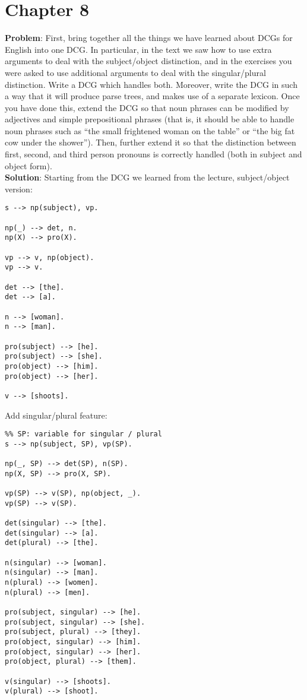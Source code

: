 \documentclass{article}
\begin{document}
\section{Chapter 8}
\textbf{Problem}: First, bring together all the things we have learned
about DCGs for English into one DCG.
In particular, in the text we saw how to use extra arguments
to deal with the subject/object distinction,
and in the exercises you were asked to use additional arguments
to deal with the singular/plural distinction.
Write a DCG which handles both.
Moreover, write the DCG in such a way that
it will produce parse trees, and makes use of a separate lexicon.
Once you have done this, extend the DCG so that
noun phrases can be modified by adjectives
and simple prepositional phrases
(that is, it should be able to handle noun phrases such as
“the small frightened woman on the table” or “the big fat cow under the shower”).
Then, further extend it so that the distinction between
first, second, and third person pronouns is correctly handled
(both in subject and object form). \\

\noindent
\textbf{Solution}:
Starting from the DCG we learned from the lecture, subject/object version:
\begin{verbatim}
s --> np(subject), vp.

np(_) --> det, n.
np(X) --> pro(X).

vp --> v, np(object).
vp --> v.

det --> [the].
det --> [a].

n --> [woman].
n --> [man].

pro(subject) --> [he].
pro(subject) --> [she].
pro(object) --> [him].
pro(object) --> [her].

v --> [shoots].
\end{verbatim}

\noindent
Add singular/plural feature:
\begin{verbatim}
%% SP: variable for singular / plural
s --> np(subject, SP), vp(SP).

np(_, SP) --> det(SP), n(SP).
np(X, SP) --> pro(X, SP).

vp(SP) --> v(SP), np(object, _).
vp(SP) --> v(SP).

det(singular) --> [the].
det(singular) --> [a].
det(plural) --> [the].

n(singular) --> [woman].
n(singular) --> [man].
n(plural) --> [women].
n(plural) --> [men].

pro(subject, singular) --> [he].
pro(subject, singular) --> [she].
pro(subject, plural) --> [they].
pro(object, singular) --> [him].
pro(object, singular) --> [her].
pro(object, plural) --> [them].

v(singular) --> [shoots].
v(plural) --> [shoot].
\end{verbatim}
\end{document}
